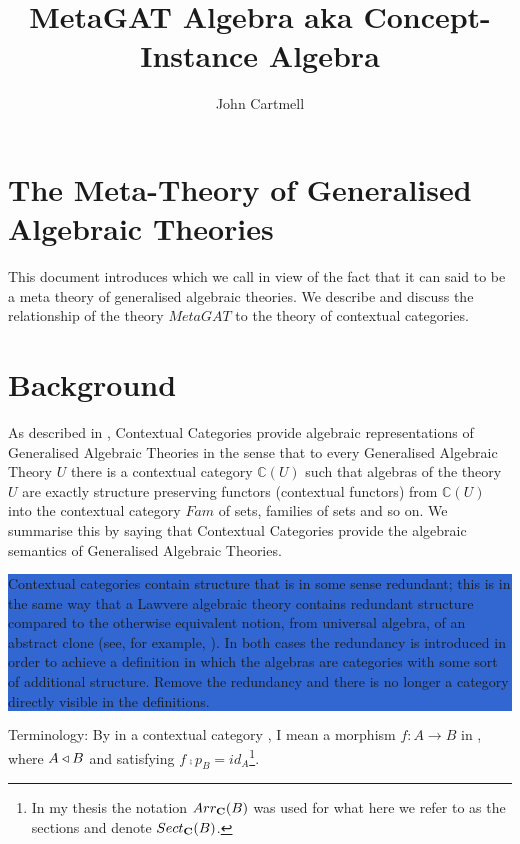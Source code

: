 \documentclass[10pt,a4paper]{article}
\title{MetaGAT Algebra aka Concept-Instance Algebra}
\author{John Cartmell}
\newcommand{\highlightpara}[1]{\colorbox{highlight}{%
    \parbox{\dimexpr\linewidth-2\fboxsep}%
        {#1}}
}
\begin{document}
\maketitle

\section{The Meta-Theory of Generalised Algebraic Theories}
This document introduces     
which we call  in view of the fact that it can said to be a meta theory of generalised algebraic theories. We describe and discuss the relationship of the theory $MetaGAT$ to the theory of contextual categories.  

\section{Background}
As described in \cite{Cartmell86}, Contextual Categories provide algebraic representations of Generalised Algebraic Theories  in the sense that to every Generalised Algebraic Theory $U$ there is a contextual category $\mathbb{C}(U)$ such that algebras of the theory $U$ are exactly structure preserving functors (contextual functors)  from $\mathbb{C}(U)$ into the contextual category $Fam$ of sets, families of sets and so on. We summarise this by saying that Contextual Categories provide the algebraic semantics of Generalised Algebraic Theories. 

\noindent
\highlightpara{Contextual categories contain structure that is in some sense redundant; this is in the same way that a Lawvere algebraic theory contains redundant structure compared to the otherwise equivalent notion, from universal algebra, of an abstract clone (see, for example, \cite{KerkoffonClones}). In both cases the redundancy is introduced in order to achieve a definition in which the algebras are categories with some sort of additional structure. Remove the redundancy and there is no longer a category directly visible in the definitions.}

Terminology: By 
 in a contextual category \catc, I mean a morphism $f:A\rightarrow B$ in \catc, where 
$A \triangleleft B$ and satisfying  $f \comp p_B = id_A$\footnote{In my thesis the notation $Arr_{\textbf{C}}(B)$ was used for what here we refer to as the sections and denote $Sect_{\textbf{C}}(B)$.}.
\end{document}
